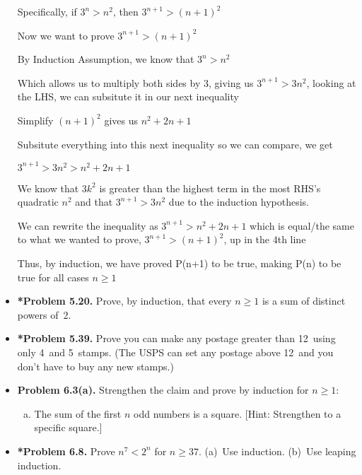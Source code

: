 \documentclass[11pt]{article}
\begin{document}
\begin{itemize}
  Specifically, if $3^n > n^2$, then $3^{n+1} > (n+1)^2$

  Now we want to prove $3^{n+1} > (n+1)^2$

  By Induction Assumption, we know that $3^n > n^2$

  Which allows us to multiply both sides by 3, giving us $3^{n+1} > 3n^2$, looking at the LHS, we can subsitute it in our next inequality

  Simplify $(n+1)^2$ gives us $ n^2 + 2n +1$
  
  Subsitute everything into this next inequality so we can compare, we get

  $3^{n+1} > 3n^2 > n^2 + 2n + 1$

  We know that $3k^2$ is greater than the highest term in the most RHS's quadratic $n^2$ and that $3^{n+1} > 3n^2$ due to the induction hypothesis. 

  We can rewrite the inequality as $3^{n+1} > n^2 + 2n + 1$ which is equal/the same to what we wanted to prove, $3^{n+1} > (n+1)^2$, up in the 4th line
  
  Thus, by induction, we have proved P(n+1) to be true, making P(n) to be true for all cases $n \geq 1$

\vspace{0.1in}

\item \textbf{*Problem 5.20.}
  Prove, by induction, that every $n\ge 1$ is a sum of distinct powers of~2.

\vspace{0.1in}

\item \textbf{*Problem 5.39.}
  Prove you can make any postage greater than 12\textcent\
  using only 4\textcent\  and 5\textcent\  stamps.
  (The USPS can set any postage above 12\textcent\  and you don't have to buy any new stamps.)

\vspace{0.1in}

\item \textbf{Problem 6.3(a).}
  Strengthen the claim and prove by induction for $n\ge 1$:
  \begin{enumerate}[(a)]
  \item The sum of the first $n$ odd numbers is a square.
    [Hint: Strengthen to a specific square.]
  \end{enumerate}

\vspace{0.1in}

\item \textbf{*Problem 6.8.}
  Prove $n^7<2^n$ for $n\ge 37$.
  (a)~Use induction.
  (b)~Use leaping induction.


\end{itemize}
\end{document}
